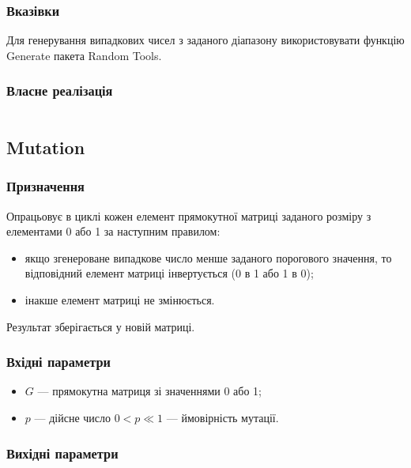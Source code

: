 \documentclass[a4paper, 12pt]{article}
\numberwithin{equation}{section}
\begin{document}
\subsubsection{Вказівки}

Для генерування випадкових чисел з заданого діапазону використовувати функцію Generate пакета Random Tools.

\subsubsection{Власне реалізація}

\inputminted[firstline=7, lastline=40]{python}{../code/generation_dec.py}

\subsection{Mutation}

\subsubsection{Призначення}

Опрацьовує в циклі кожен елемент прямокутної матриці заданого розміру з елементами 0 або 1 за наступним правилом: 
\begin{itemize}
    \item якщо згенероване випадкове число менше заданого порогового значення, то відповідний елемент матриці інвертується (0 в 1 або 1 в 0);
    \item інакше елемент матриці не змінюється. 
\end{itemize}

Результат зберігається у новій матриці.

\subsubsection{Вхідні параметри}

\begin{itemize}
    \item $G$ --- прямокутна матриця зі значеннями 0 або 1;
    \item $p$ --- дійсне число $0 < p \ll 1$ --- ймовірність мутації.
\end{itemize}

\subsubsection{Вихідні параметри}
\end{document}
